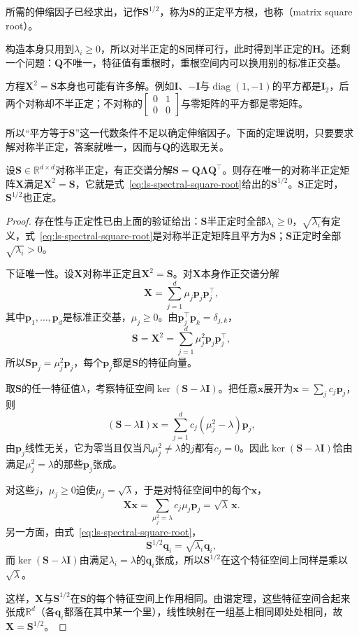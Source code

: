 所需的伸缩因子已经求出，记作$\bm S^{1/2}$，称为$\bm S$的正定平方根，也称（matrix square root）。

构造本身只用到$\lambda_i\geq0$，所以对半正定的$\bm S$同样可行，此时得到半正定的$\bm H$。还剩一个问题：$\bm Q$不唯一，特征值有重根时，重根空间内可以换用别的标准正交基。

方程$\bm X^2=\bm S$本身也可能有许多解。例如$\bm I$、$-\bm I$与$\operatorname{diag}(1,-1)$的平方都是$\bm I_2$，后两个对称却不半正定；不对称的$\left[\begin{smallmatrix}0&1\\0&0\end{smallmatrix}\right]$与零矩阵的平方都是零矩阵。

所以“平方等于$\bm S$”这一代数条件不足以确定伸缩因子。下面的定理说明，只要要求解对称半正定，答案就唯一，因而与$\bm Q$的选取无关。

\begin{theorem}[半正定平方根的存在与唯一]
\label{thm:ls-psd-square-root}
设$\bm S\in\mathbb R^{d\times d}$对称半正定，有正交谱分解$\bm S=\bm Q\bm\Lambda\bm Q^\top$。则存在唯一的对称半正定矩阵$\bm X$满足$\bm X^2=\bm S$，它就是式~\eqref{eq:ls-spectral-square-root}给出的$\bm S^{1/2}$。$\bm S$正定时，$\bm S^{1/2}$也正定。
\end{theorem}
\begin{proof}
存在性与正定性已由上面的验证给出：$\bm S$半正定时全部$\lambda_i\geq0$，$\sqrt{\lambda_i}$有定义，式~\eqref{eq:ls-spectral-square-root}是对称半正定矩阵且平方为$\bm S$；$\bm S$正定时全部$\sqrt{\lambda_i}>0$。

下证唯一性。设$\bm X$对称半正定且$\bm X^2=\bm S$。对$\bm X$本身作正交谱分解
\[
 \bm X=\sum_{j=1}^d\mu_j\bm p_j\bm p_j^\top ,
\]
其中$\bm p_1,\ldots,\bm p_d$是标准正交基，$\mu_j\geq0$。由$\bm p_j^\top\bm p_k=\delta_{j,k}$，
\[
 \bm S=\bm X^2=\sum_{j=1}^d\mu_j^2\bm p_j\bm p_j^\top ,
\]
所以$\bm S\bm p_j=\mu_j^2\bm p_j$，每个$\bm p_j$都是$\bm S$的特征向量。

取$\bm S$的任一特征值$\lambda$，考察特征空间$\ker(\bm S-\lambda\bm I)$。把任意$\bm x$展开为$\bm x=\sum_jc_j\bm p_j$，则
\[
 (\bm S-\lambda\bm I)\bm x=\sum_{j=1}^dc_j(\mu_j^2-\lambda)\bm p_j ,
\]
由$\bm p_j$线性无关，它为零当且仅当凡$\mu_j^2\neq\lambda$的$j$都有$c_j=0$。因此$\ker(\bm S-\lambda\bm I)$恰由满足$\mu_j^2=\lambda$的那些$\bm p_j$张成。

对这些$j$，$\mu_j\geq0$迫使$\mu_j=\sqrt\lambda$，于是对特征空间中的每个$\bm x$，
\[
 \bm X\bm x=\sum_{\mu_j^2=\lambda}c_j\mu_j\bm p_j=\sqrt\lambda\,\bm x .
\]
另一方面，由式~\eqref{eq:ls-spectral-square-root}，
\[
 \bm S^{1/2}\bm q_i=\sqrt{\lambda_i}\bm q_i ,
\]
而$\ker(\bm S-\lambda\bm I)$由满足$\lambda_i=\lambda$的$\bm q_i$张成，所以$\bm S^{1/2}$在这个特征空间上同样是乘以$\sqrt\lambda$。

这样，$\bm X$与$\bm S^{1/2}$在$\bm S$的每个特征空间上作用相同。由谱定理，这些特征空间合起来张成$\mathbb R^d$（各$\bm q_i$都落在其中某一个里），线性映射在一组基上相同即处处相同，故$\bm X=\bm S^{1/2}$。
\end{proof}

